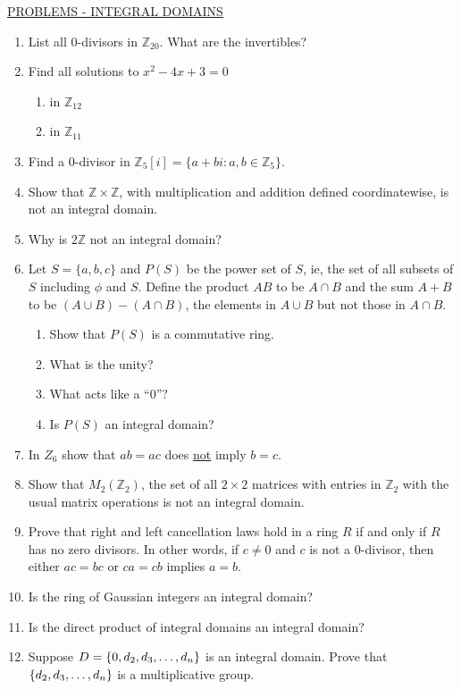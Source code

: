 \documentclass[12pt]{book}
\theoremstyle{definition}
\def\Z{\mathbb{Z}}
\begin{document}
\newpage
\underline{PROBLEMS - INTEGRAL DOMAINS}
\begin{enumerate}
\item List all 0-divisors in $\Z_{20}$.  What are the invertibles?
\item Find all solutions to $x^2-4x+3=0$
\begin{enumerate}
\item in $\Z_{12}$
\item in $\Z_{11}$
\end{enumerate}
\item Find a 0-divisor in $\Z_5[i]=\{a+bi:a,b\in \Z_5\}$.
\item Show that $\Z\times \Z$, with multiplication and addition defined coordinatewise, is not an integral domain.
\item Why is $2\Z$ not an integral domain?
\item Let $S=\{a,b,c\}$ and $P(S)$ be the power set  of $S$, ie, the set of all subsets of $S$ including $\phi$ and $S$.  Define the product $AB$ to be $A\cap B$ and the sum $A+B$ to be $(A\cup B)-(A\cap B)$, the elements in $A\cup B$ but not those in $A\cap B$.
\begin{enumerate}
\item Show that $P(S)$ is a commutative ring.
\item What is the unity?
\item What acts like a ``0''?
\item Is $P(S)$ an integral domain?
\end{enumerate}
\item In $Z_6$ show that $ab=ac$ does \underline{not} imply $b=c$.
\item Show that $ M_2(\Z_2) $, the set of all $ 2\times 2 $ matrices with entries in $ \Z_2 $ with the usual matrix operations is not an integral domain.
\item Prove that right and left cancellation laws hold in a ring $ R $ if and only if $ R $ has no zero divisors. In other words, if $ c\neq 0 $ and $ c $ is not a $ 0 $-divisor, then either $ ac=bc $ or $ ca=cb $ implies $ a=b $.
\item Is the ring of Gaussian integers an integral domain?
\item Is the direct product of integral domains an integral domain?
\item Suppose $ D=\{0,d_2,d_3,\text{\dots},d_n\} $ is an integral domain. Prove that $\{d_2,d_3,\text{\dots},d_n\}$ is a multiplicative group. 
\end{enumerate}
\end{document}
